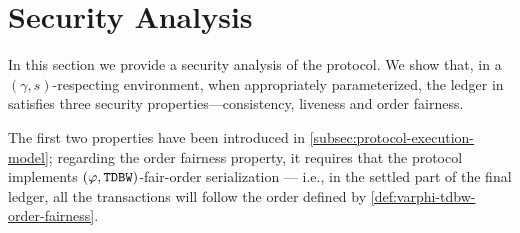 \section{Security Analysis}
\label{sec:security-analysis}

In this section we provide a security analysis of the \Taxis protocol.
%
We show that, in a $(\gamma, s)$-respecting environment, when appropriately parameterized, the ledger \ledger in \Taxis satisfies three security properties---consistency, liveness and order fairness.

The first two properties have been introduced in \cref{subsec:protocol-execution-model}; regarding the order fairness property, it requires that the protocol implements $(\varphi, \mathtt{TDBW})$-fair-order serialization --- i.e., in the settled part of the final ledger, all the transactions will follow the order defined by \cref{def:varphi-tdbw-order-fairness}.




